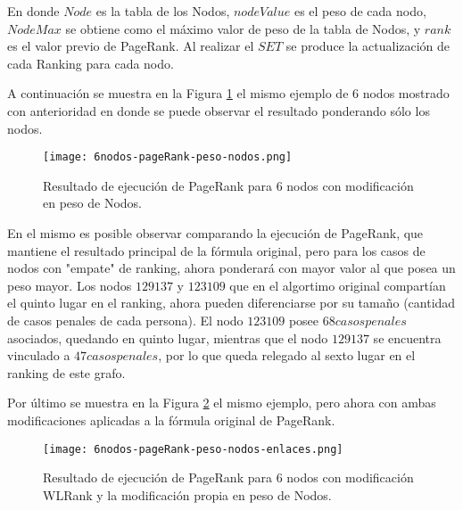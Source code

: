 En donde $Node$ es la tabla de los Nodos, $nodeValue$ es el peso de cada nodo, $NodeMax$ se obtiene como el máximo valor de peso de la tabla de Nodos, y $rank$ es el valor previo de PageRank. Al realizar el $SET$ se produce la actualización de cada Ranking para cada nodo. 

A continuación se muestra en la Figura \ref{fig:6nodos-pageRank-peso-nodos} el mismo ejemplo de 6 nodos mostrado con anterioridad en donde se puede observar el resultado ponderando sólo los nodos.

\begin{figure}
	\centering
	\texttt{[image: 6nodos-pageRank-peso-nodos.png]}
	\caption{Resultado de ejecución de PageRank para 6 nodos con modificación en peso de Nodos.} 
	\label{fig:6nodos-pageRank-peso-nodos}
\end{figure}

En el mismo es posible observar comparando la ejecución de PageRank, que mantiene el resultado principal de la fórmula original, pero para los casos de nodos con "empate" de ranking, ahora ponderará con mayor valor al que posea un peso mayor. Los nodos $129137$ y $123109$ que en el algortimo original compartían el quinto lugar en el ranking, ahora pueden diferenciarse por su tamaño (cantidad de casos penales de cada persona). El nodo $123109$ posee $68 casos penales$ asociados, quedando en quinto lugar, mientras que el nodo $129137$ se encuentra vinculado a $47 casos penales$, por lo que queda relegado al sexto lugar en el ranking de este grafo.

Por último se muestra en la Figura \ref{fig:6nodos-pageRank-peso-nodos-enlaces} el mismo ejemplo, pero ahora con ambas modificaciones aplicadas a la fórmula original de PageRank.

\begin{figure}
	\centering
	\texttt{[image: 6nodos-pageRank-peso-nodos-enlaces.png]}
	\caption{Resultado de ejecución de PageRank para 6 nodos con modificación WLRank y la modificación propia en peso de Nodos.} 
	\label{fig:6nodos-pageRank-peso-nodos-enlaces}
\end{figure}

